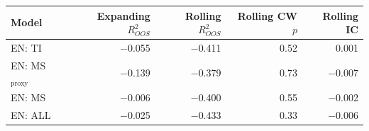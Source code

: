 \begin{tabular}{lrrrr}
\toprule
Model & Expanding $R^2_{OOS}$ & Rolling $R^2_{OOS}$ & Rolling CW $p$ & Rolling IC\\
\midrule
EN: TI & \ensuremath{-}0.055 & \ensuremath{-}0.411 & 0.52 & 0.001\\
EN: MS$_{\text{proxy}}$ & \ensuremath{-}0.139 & \ensuremath{-}0.379 & 0.73 & \ensuremath{-}0.007\\
EN: MS & \ensuremath{-}0.006 & \ensuremath{-}0.400 & 0.55 & \ensuremath{-}0.002\\
EN: ALL & \ensuremath{-}0.025 & \ensuremath{-}0.433 & 0.33 & \ensuremath{-}0.006\\
\bottomrule
\end{tabular}
